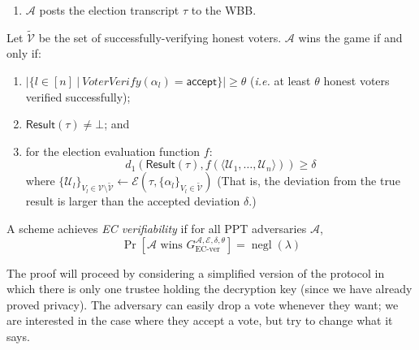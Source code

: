 \documentclass[12pt,a4paper]{article}
\DeclareMathOperator{\negl}{\text{negl}}
\theoremstyle{definition}
\newcommand{\ie}{\textit{i.e. }}
\begin{document}
\begin{definition}[EC Verifiability]
\begin{enumerate}
        \item $\mathcal{A}$ posts the election transcript $\tau$ to the WBB.
    \end{enumerate}
    Let $\tilde{\mathcal{V}}$ be the set of successfully-verifying honest voters. 
    $\mathcal{A}$ wins the game if and only if:
    \begin{enumerate}
        \item $|\{l\in [n]\ |\ \mathit{VoterVerify}(\alpha_l)=\mathsf{accept}\}| \geq \theta$ (\ie at least $\theta$ honest voters verified successfully);
        \item $\mathsf{Result}(\tau)\neq\bot$; and
        \item for the election evaluation function $f$:
                    $$d_1(\mathsf{Result}(\tau), f(\langle\mathcal{U}_1,\ldots,\mathcal{U}_n\rangle)) \geq \delta$$
            where $\{\mathcal{U}_l\}_{V_l \in \mathcal{V} \setminus \tilde{\mathcal{V}}} \leftarrow \mathcal{E}(\tau, \{\alpha_l \}_{V_l \in \tilde{\mathcal{V}}})$
            (That is, the deviation from the true result is larger than the accepted deviation $\delta$.)
    \end{enumerate}
    A scheme achieves \textit{EC verifiability} if for all PPT adversaries $\mathcal{A}$, $$\Pr\left[\mathcal{A}\text{ wins }G_\text{EC-ver}^{\mathcal{A},\mathcal{E},\delta,\theta}\right]=\negl(\lambda)$$
\end{definition}

The proof will proceed by considering a simplified version of the protocol in which there is only one trustee holding the decryption key (since we have already proved privacy). The adversary can easily drop a vote whenever they want; we are interested in the case where they accept a vote, but try to change what it says.
\end{document}
